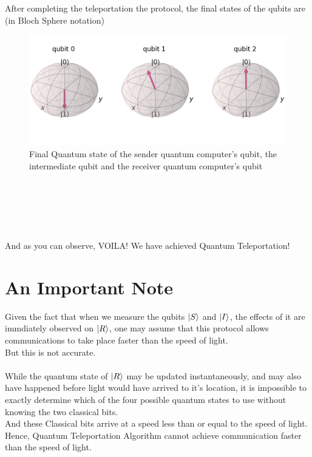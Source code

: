 \documentclass[a4paper]{article}
\begin{document}
After completing the teleportation the protocol, the final states of the qubits are (in Bloch Sphere notation) \\
\begin{figure}[htp]
\includegraphics[width=\textwidth]{after.png}
\caption{Final Quantum state of the sender quantum computer's qubit, the intermediate qubit and the receiver quantum computer's qubit}
\label{fig:after}
\end{figure} \\
\\ \\ \\ \\
And as you can observe, VOILA! We have achieved Quantum Teleportation!

\section{An Important Note}
Given the fact that when we measure the qubits $\ket{S}$ and $\ket{I}$, the effects of it are immdiately observed on $\ket{R}$, one may assume that this protocol allows communications to take place faster than the speed of light. \\
But this is not accurate. \\ \\
While the quantum state of $\ket{R}$ may be updated instantaneously, and may also have happened before light would have arrived to it's location, it is impossible to exactly determine which of the four possible quantum states to use without knowing the two classical bits. \\
And these Classical bits arrive at a speed less than or equal to the speed of light. \\
Hence, Quantum Teleportation Algorithm cannot achieve communication faster than the speed of light.
\end{document}
